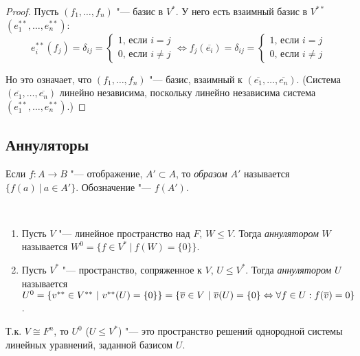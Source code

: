 \begin{proof}
	Пусть $(f_1, \dots, f_n)$ "--- базис в $V^*$. У него есть взаимный базис в $V^{**}$ $(e_1^{**}, \dots, e_n^{**})$:
	\[e^{**}_i(f_j) = \delta_{ij} = \begin{cases}1\text{, если }i = j\\0\text{, если }i \ne j\end{cases} \Leftrightarrow f_j(\overline{e_i}) = \delta_{ij} = \begin{cases}1\text{, если }i = j\\0\text{, если }i \ne j\end{cases}\]
	
	Но это означает, что $(f_1, \dots, f_n)$ "--- базис, взаимный к $(\overline{e_1}, \dots, \overline{e_n})$. (Система $(\overline{e_1}, \dots, \overline{e_n})$ линейно независима, поскольку линейно независима система $(e_1^{**}, \dots, e_n^{**})$.)
\end{proof}

\subsection{Аннуляторы}

\begin{definition}
	Если $f: A \rightarrow B$ "--- отображение, $A' \subset A$, то \textit{образом} $A'$ называется $\{f(a)~|~a \in A'\}$. Обозначение "--- $f(A')$.
\end{definition}

\begin{definition}~
	\begin{enumerate}
		\item Пусть $V$ "--- линейное пространство над $F$, $W \le V$. Тогда \textit{аннулятором} $W$ называется $W^0 = \{f \in V^*~|~f(W) = \{0\}\}$.
		\item Пусть $V^*$ "--- пространство, сопряженное к $V$, $U \le V^*$. Тогда \textit{аннулятором} $U$ называется $U^0 = \{v^{**} \in V^{**}~|~v^{**}(U) = \{0\}\} \hm{=} \{\overline{v} \in V~|~\overline{v}(U) = \{0\} \Leftrightarrow \forall f \in U: f(\overline{v}) = 0\}$.
	\end{enumerate}
\end{definition}

\begin{note}
	Т.\:к. $V \cong F^n$, то $U^0$ ($U \le V^*$) "--- это пространство решений однородной системы линейных уравнений, заданной базисом $U$.
\end{note}

